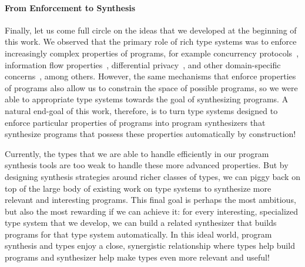 \paragraph{From Enforcement to Synthesis}

Finally, let us come full circle on the ideas that we developed at the beginning of this work.
We observed that the primary role of rich type systems was to enforce increasingly complex properties of programs, for example concurrency protocols~\cite{mazurak-icfp-2010}, information flow properties~\cite{jia-icfp-2008}, differential privacy~\cite{gaboardi-popl-2013}, and other domain-specific concerns~\cite{hudak-handbook-pl-1998}, among others.
However, the same mechanisms that enforce properties of programs also allow us to constrain the space of possible programs, so we were able to appropriate type systems towards the goal of synthesizing programs.
A natural end-goal of this work, therefore, is to turn type systems designed to enforce particular properties of programs into program synthesizers that synthesize programs that possess these properties automatically by construction!

Currently, the types that we are able to handle efficiently in our program synthesis tools are too weak to handle these more advanced properties.
But by designing synthesis strategies around richer classes of types, we can piggy back on top of the large body of existing work on type systems to synthesize more relevant and interesting programs.
This final goal is perhaps the most ambitious, but also the most rewarding if we can achieve it: for every interesting, specialized type system that we develop, we can build a related synthesizer that builds programs for that type system automatically.
In this ideal world, program synthesis and types enjoy a close, synergistic relationship where types help build programs and synthesizer help make types even more relevant and useful!
